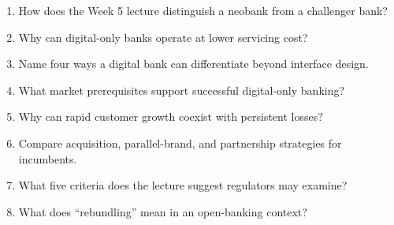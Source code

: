 \begin{quickcheck}
\begin{enumerate}
  \item How does the Week 5 lecture distinguish a neobank from a challenger bank?
  \item Why can digital-only banks operate at lower servicing cost?
  \item Name four ways a digital bank can differentiate beyond interface design.
  \item What market prerequisites support successful digital-only banking?
  \item Why can rapid customer growth coexist with persistent losses?
  \item Compare acquisition, parallel-brand, and partnership strategies for incumbents.
  \item What five criteria does the lecture suggest regulators may examine?
  \item What does ``rebundling'' mean in an open-banking context?
\end{enumerate}
\end{quickcheck}
